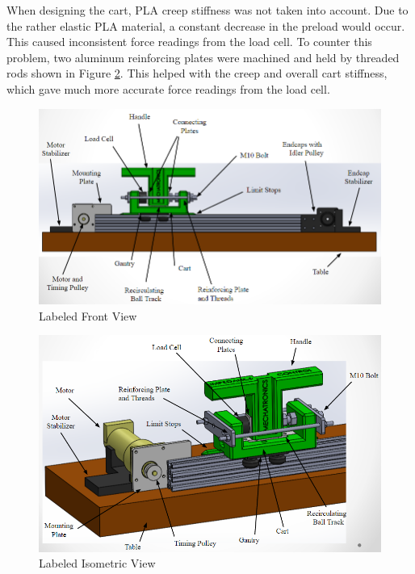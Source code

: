 When designing the cart, PLA creep stiffness was not taken into account. Due to the rather elastic PLA material, a constant decrease in the preload would occur. This caused inconsistent force readings from the load cell. To counter this problem, two aluminum reinforcing plates were machined and held by threaded rods shown in Figure \ref{fig:Annotated_Iso}. This helped with the creep and overall cart stiffness, which gave much more accurate force readings from the load cell.
\begin{figure}[h]
	\centering
	\includegraphics[width=1\linewidth]{Images/Annotated_Front}
	\caption{Labeled Front View}
	\label{fig:Annotated_Front}
\end{figure}
\begin{figure}[h]	
\centering
\includegraphics[width=1\linewidth]{Images/Annotated_Iso}
\caption{Labeled Isometric View}
\label{fig:Annotated_Iso}
\end{figure}
